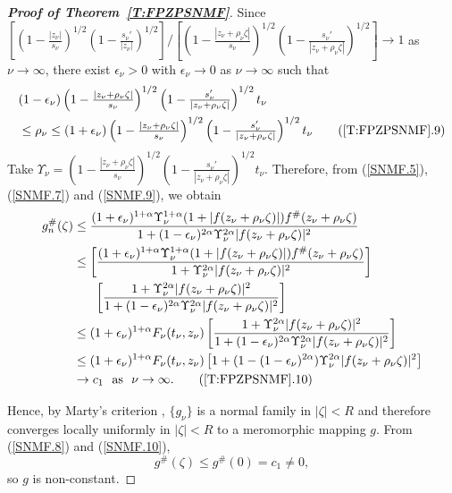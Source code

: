 \documentclass[11pt, reqno]{amsart}
\theoremstyle{definition}
\theoremstyle{remark}
\numberwithin{equation}{section}
\begin{document}
\begin{proof}[{\bf Proof of Theorem~\ref{T:FPZPSNMF}}]
Since $\left[\left(1-\frac{|z_{\nu}|}{s_{\nu}}\right)^{1/2}\left(1-\frac{s_{\nu}'}{|z_{\nu}|}\right)^{1/2}\right]/\left[\left(1-\frac{|z_{\nu}+\rho_{\nu} \zeta|}{s_{\nu}}\right)^{1/2}\left(1-\frac{s_{\nu}'}{|z_{\nu}+\rho_{\nu} \zeta|}\right)^{1/2}\right]\to 1$ as $\nu\to \infty$, there exist $\epsilon_{\nu}>0$ with $\epsilon_\nu\to 0$ as $\nu\to \infty$ such that 
\begin{align*} \label{SNMF.9}
    &(1-\epsilon_{\nu})\left(1-\tfrac{|z_{\nu}+\rho_{\nu} \zeta|}{s_{\nu}}\right)^{1/2}\left(1-\tfrac{s_{\nu}'}{|z_{\nu}+\rho_{\nu} \zeta|}\right)^{1/2}t_{\nu}\\ &\leq \rho_{\nu} \leq (1+\epsilon_{\nu})\left(1-\tfrac{|z_{\nu}+\rho_{\nu} \zeta|}{s_{\nu}}\right)^{1/2}\left(1-\tfrac{s_{\nu}'}{|z_{\nu}+\rho_{\nu} \zeta|}\right)^{1/2}t_{\nu} \tag{\ref*{T:FPZPSNMF}.9}
\end{align*} 
Take $\Upsilon_{\nu}=\left(1-\tfrac{|z_{\nu}+\rho_{\nu} \zeta|}{s_{\nu}}\right)^{1/2} \left(1-\tfrac{s_{\nu}'}{|z_{\nu}+\rho_{\nu} \zeta|}\right)^{1/2} t_{\nu}$.
Therefore, from (\ref{SNMF.5}), (\ref{SNMF.7}) and (\ref{SNMF.9}), we obtain 
\begin{align*}
g^\#_n(\zeta)&\le  \dfrac{(1+\epsilon_{\nu})^{1+\alpha}\Upsilon_{\nu}^{1+\alpha}(1+|f(z_{\nu}+\rho_{\nu} \zeta)|)f^{\#}(z_{\nu}+\rho_{\nu} \zeta)}{1+(1-\epsilon_{\nu})^{2\alpha}\Upsilon_{\nu}^{2\alpha}|f(z_{\nu}+\rho_{\nu} \zeta)|^2}\\
&\le  \left[\dfrac{(1+\epsilon_{\nu})^{1+\alpha}\Upsilon_{\nu}^{1+\alpha}(1+|f(z_{\nu}+\rho_{\nu} \zeta)|)f^{\#}(z_{\nu}+\rho_{\nu} \zeta)}{1+\Upsilon_{\nu}^{2\alpha}|f(z_{\nu}+\rho_{\nu} \zeta)|^2}\right]\\
&\ \ \ ~~  \left[\dfrac{1+\Upsilon_{\nu}^{2\alpha}|f(z_{\nu}+\rho_{\nu} \zeta)|^2}{1+(1-\epsilon_{\nu})^{2\alpha}\Upsilon_{\nu}^{2\alpha}|f(z_{\nu}+\rho_{\nu} \zeta)|^2}\right]\\
&\leq (1+\epsilon_{\nu})^{1+\alpha}F_{\nu}(t_{\nu},z_{\nu})\left[\dfrac{1+\Upsilon_{\nu}^{2\alpha}|f(z_{\nu}+\rho_{\nu} \zeta)|^2}{1+(1-\epsilon_{\nu})^{2\alpha}\Upsilon_{\nu}^{2\alpha}|f(z_{\nu}+\rho_{\nu} \zeta)|^2}\right]\\
&\leq (1+\epsilon_{\nu})^{1+\alpha} F_{\nu}(t_{\nu},z_{\nu})\left[1+(1-(1-\epsilon_{\nu})^{2\alpha})\Upsilon_{\nu}^{2\alpha}|f(z_{\nu}+\rho_{\nu} \zeta)|^2\right]\\
&\to c_1\ \text{ as }\ \nu\to\infty.
\tag{\ref*{T:FPZPSNMF}.10} \label{SNMF.10}
\end{align*}

Hence, by Marty's criterion \cite[p. 226, Theorem 17]{ahlfors-ca-1968}, $\{g_{\nu}\}$ is a normal family 
in $|\zeta|<R$ and therefore converges locally
uniformly in $|\zeta|<R$ to a meromorphic mapping $g$. From (\ref{SNMF.8}) and (\ref{SNMF.10}),
\begin{equation*}
g^{\#}(\zeta) \le g^{\#}(0)=c_1 \neq 0,
\end{equation*}
so $g$ is non-constant.
\end{proof}
\end{document}
